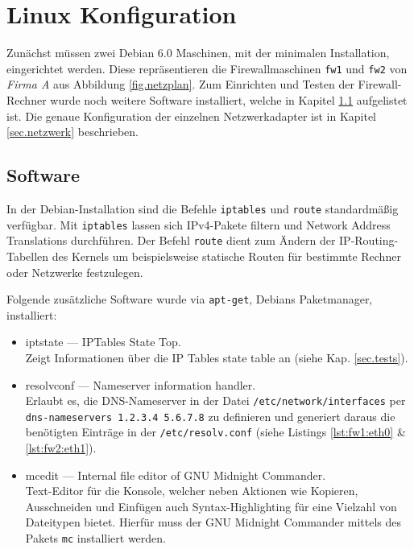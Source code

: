 \section{Linux Konfiguration}

Zunächst müssen zwei Debian 6.0 Maschinen,
mit der minimalen Installation, eingerichtet werden.
Diese repräsentieren die Firewallmaschinen {\tt fw1} und {\tt fw2} von
\emph{Firma A} aus Abbildung \ref{fig.netzplan}.
Zum Einrichten und Testen der Firewall-Rechner wurde noch weitere Software
installiert, welche in Kapitel \ref{sec.software} aufgelistet ist.
Die genaue Konfiguration der einzelnen Netzwerkadapter ist in Kapitel
\ref{sec.netzwerk} beschrieben.


\subsection{Software}\label{sec.software}

In der Debian-Installation sind die Befehle {\tt iptables} und {\tt route}
standardmäßig verfügbar.
Mit {\tt iptables} lassen sich IPv4-Pakete filtern und Network Address
Translations durchführen.
Der Befehl {\tt route} dient zum Ändern der IP-Routing-Tabellen des Kernels um
beispielsweise statische Routen für bestimmte Rechner oder Netzwerke
festzulegen.

Folgende zusätzliche Software wurde via {\tt apt-get}, Debians Paketmanager,
installiert:

\begin{itemize}
    \item iptstate --- IPTables State Top.\\
        Zeigt Informationen über die IP Tables state table an (siehe Kap.
        \ref{sec.tests}).
    \item resolvconf --- Nameserver information handler.\\
        Erlaubt es, die DNS-Nameserver in der Datei
        {\tt /etc/network/interfaces}
        per {\tt dns-nameservers 1.2.3.4 5.6.7.8} zu definieren und
        generiert daraus die benötigten Einträge in der {\tt /etc/resolv.conf}
        (siehe Listings \ref{lst:fw1:eth0} \& \ref{lst:fw2:eth1}).
    \item mcedit --- Internal file editor of GNU Midnight Commander.\\
        Text-Editor für die Konsole, welcher neben Aktionen wie Kopieren,
        Ausschneiden und Einfügen auch Syntax-Highlighting für eine Vielzahl von
        Dateitypen bietet. Hierfür muss der GNU Midnight Commander mittels des
        Pakets {\tt mc} installiert werden.
\end{itemize}


